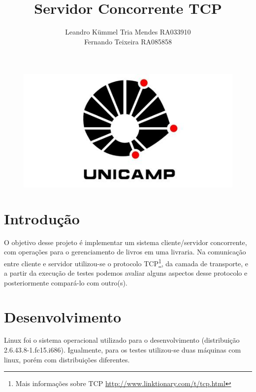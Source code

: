 \documentclass[a4paper,10pt]{article}
\title{Servidor Concorrente TCP}
\author{Leandro Kümmel Tria Mendes RA033910 \\ Fernando Teixeira RA085858}
\begin{document}
\maketitle
\begin{figure}[!htb]
  \centering
  \includegraphics[scale=0.5]{logo.jpg}
\end{figure}
\newpage
\tableofcontents
\listoffigures
\listoftables
\newpage
\section{Introdução}
O objetivo desse projeto é implementar um sistema cliente/servidor
concorrente, com operações para o gerenciamento de livros em uma livraria.
Na comunicação entre cliente e servidor utilizou-se o protocolo TCP\footnote{
Mais informações sobre TCP \url{http://www.linktionary.com/t/tcp.html} }, da camada de transporte, e a partir da execução de testes podemos avaliar alguns aspectos
desse protocolo e posteriormente compará-lo com outro(s).
\section{Desenvolvimento}
Linux foi o sistema operacional utilizado para o desenvolvimento (distribuição
2.6.43.8-1.fc15.i686). Igualmente, para os testes utilizou-se duas máquinas com linux, porém com distribuições diferentes.
\end{document}
